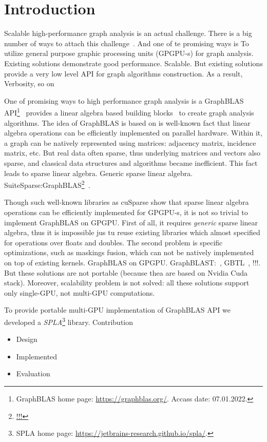 \section{Introduction}

Scalable high-performance graph analysis is an actual challenge. There is a big number of ways to attach this challenge~\cite{Coimbra2021}.
And one of te promising ways is To utilize general purpose graphic processing units (GPGPU-s) for graph analysis.
Existing solutions demonstrate good performance.
Scalable. 
But existing solutions provide a very low level API for graph algorithms construction.
As a result, Verbosity, so on

One of promising ways to high performance graph analysis is a GraphBLAS API\footnote{GraphBLAS home page: \url{https://graphblas.org/}. Accass date: 07.01.2022.}~\cite{!!!} provides a linear algebra based building blocks~\cite{7761646} to create graph analysis algorithms.
The idea of GraphBLAS is based on is well-known fact that linear algebra operations can be efficiently implemented on parallel hardware.
Within it, a graph can be natively represented using matrices: adjacency matrix, incidence matrix, etc.
But real data often sparse, thus underlying matrices and vectors also sparse, and classical data structures and algorithms became inefficient. 
This fact leads to sparse linear algebra.
Generic sparse linear algebra.
SuiteSparse:GraphBLAS\footnote{\url{!!!}}~\cite{!!!}.

Though such well-known libraries as cuSparse show that sparse linear algebra operations can be efficiently implemented for GPGPU-s, it is not so trivial to implement GraphBLAS on GPGPU. 
First of all, it requires \textit{generic} sparse linear algebra, thus it is impossible jus tu reuse existing libraries which almost specified for operations over floats and doubles.
The second problem is specific optimizations, such as maskings fusion, which can not be natively implemented on top of existing kernels.
GraphBLAS on GPGPU.
GraphBLAST:~\cite{yang2019graphblast}, GBTL~\cite{!!!}, !!!.
But these solutions are not portable (because thea are based on Nvidia Cuda stack).
Moreover, scalability problem is not solved: all these solutions support only single-GPU, not multi-GPU computations.

To provide portable multi-GPU implementation of GraphBLAS API we developed a \textit{SPLA}\footnote{SPLA home page: \url{https://jetbrains-research.github.io/spla/}.} library.
Contribution
\begin{itemize}
    \item Design
    \item Implemented
    \item Evaluation
\end{itemize} 